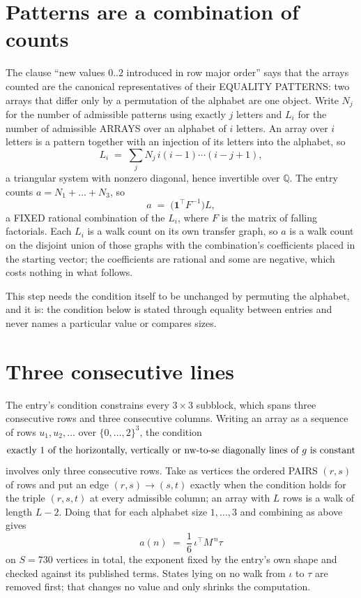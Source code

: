 \documentclass[11pt,a4paper]{article}
\theoremstyle{plain}
\theoremstyle{definition}
\begin{document}
\section{Patterns are a combination of counts}

The clause ``new values $0..2$ introduced in row major order'' says that the arrays
counted are the canonical representatives of their EQUALITY PATTERNS: two arrays that differ
only by a permutation of the alphabet are one object. Write $N_j$ for the number of admissible
patterns using exactly $j$ letters and $L_i$ for the number of admissible ARRAYS over an
alphabet of $i$ letters. An array over $i$ letters is a pattern together with an injection of
its letters into the alphabet, so
\[
L_i\;=\;\sum_{j}N_j\,i(i-1)\cdots(i-j+1),
\]
a triangular system with nonzero diagonal, hence invertible over $\mathbb{Q}$. The entry
counts $a=N_1+\dots+N_{3}$, so
\[
a\;=\;\bigl(\mathbf{1}^{\!\top}F^{-1}\bigr)L ,
\]
a FIXED rational combination of the $L_i$, where $F$ is the matrix of falling factorials.
Each $L_i$ is a walk count on its own transfer graph, so $a$ is a walk count on the disjoint
union of those graphs with the combination's coefficients placed in the starting vector; the
coefficients are rational and some are negative, which costs nothing in what follows.

This step needs the condition itself to be unchanged by permuting the alphabet, and it is:
the condition below is stated through equality between entries and never names a particular
value or compares sizes.

\section{Three consecutive lines}

The entry's condition constrains every $3\times3$ subblock, which spans three consecutive
rows and three consecutive columns. Writing an array as a sequence of rows
$u_1,u_2,\dots$ over $\{0,\dots,2\}^{3}$, the condition
\[
\text{exactly }1\text{ of the horizontally, vertically or nw-to-se diagonally lines of }g\text{ \text{is constant}}
\]
involves only three consecutive rows. Take as vertices the ordered PAIRS $(r,s)$ of
rows and put an edge $(r,s)\to(s,t)$ exactly when the condition holds for the triple
$(r,s,t)$ at every admissible column; an array with $L$ rows is a walk of length $L-2$.
Doing that for each alphabet size $1,\dots,3$ and combining as above gives
\[
a(n)\;=\;\frac{1}{6}\,\iota^{\!\top}M^{\,n}\tau
\]
on $S=730$ vertices in total, the exponent fixed by the entry's own shape and checked against
its published terms. States lying on no walk from $\iota$ to $\tau$ are removed first; that
changes no value and only shrinks the computation.
\end{document}
